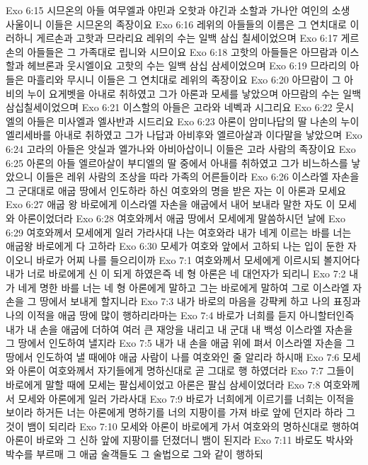 Exo 6:15  시므온의 아들 여무엘과 야민과 오핫과 야긴과 소할과 가나안 여인의 소생 사울이니 이들은 시므온의 족장이요
Exo 6:16  레위의 아들들의 이름은 그 연치대로 이러하니 게르손과 고핫과 므라리요 레위의 수는 일백 삼십 칠세이었으며
Exo 6:17  게르손의 아들들은 그 가족대로 립니와 시므이요
Exo 6:18  고핫의 아들들은 아므람과 이스할과 헤브론과 웃시엘이요 고핫의 수는 일백 삼십 삼세이었으며
Exo 6:19  므라리의 아들은 마흘리와 무시니 이들은 그 연치대로 레위의 족장이요
Exo 6:20  아므람이 그 아비의 누이 요게벳을 아내로 취하였고 그가 아론과 모세를 낳았으며 아므람의 수는 일백삼십칠세이었으며
Exo 6:21  이스할의 아들은 고라와 네벡과 시그리요
Exo 6:22  웃시엘의 아들은 미사엘과 엘사반과 시드리요
Exo 6:23  아론이 암미나답의 딸 나손의 누이 엘리세바를 아내로 취하였고 그가 나답과 아비후와 엘르아살과 이다말을 낳았으며
Exo 6:24  고라의 아들은 앗실과 엘가나와 아비아삽이니 이들은 고라 사람의 족장이요
Exo 6:25  아론의 아들 엘르아살이 부디엘의 딸 중에서 아내를 취하였고 그가 비느하스를 낳았으니 이들은 레위 사람의 조상을 따라 가족의 어른들이라
Exo 6:26  이스라엘 자손을 그 군대대로 애굽 땅에서 인도하라 하신 여호와의 명을 받은 자는 이 아론과 모세요
Exo 6:27  애굽 왕 바로에게 이스라엘 자손을 애굽에서 내어 보내라 말한 자도 이 모세와 아론이었더라
Exo 6:28  여호와께서 애굽 땅에서 모세에게 말씀하시던 날에
Exo 6:29  여호와께서 모세에게 일러 가라사대 나는 여호와라 내가 네게 이르는 바를 너는 애굽왕 바로에게 다 고하라
Exo 6:30  모세가 여호와 앞에서 고하되 나는 입이 둔한 자이오니 바로가 어찌 나를 들으리이까
Exo 7:1  여호와께서 모세에게 이르시되 볼지어다 내가 너로 바로에게 신 이 되게 하였은즉 네 형 아론은 네 대언자가 되리니
Exo 7:2  내가 네게 명한 바를 너는 네 형 아론에게 말하고 그는 바로에게 말하여 그로 이스라엘 자손을 그 땅에서 보내게 할지니라
Exo 7:3  내가 바로의 마음을 강퍅케 하고 나의 표징과 나의 이적을 애굽 땅에 많이 행하리라마는
Exo 7:4  바로가 너희를 듣지 아니할터인즉 내가 내 손을 애굽에 더하여 여러 큰 재앙을 내리고 내 군대 내 백성 이스라엘 자손을 그 땅에서 인도하여 낼지라
Exo 7:5  내가 내 손을 애굽 위에 펴서 이스라엘 자손을 그 땅에서 인도하여 낼 때에야 애굽 사람이 나를 여호와인 줄 알리라 하시매
Exo 7:6  모세와 아론이 여호와께서 자기들에게 명하신대로 곧 그대로 행 하였더라
Exo 7:7  그들이 바로에게 말할 때에 모세는 팔십세이었고 아론은 팔십 삼세이었더라
Exo 7:8  여호와께서 모세와 아론에게 일러 가라사대
Exo 7:9  바로가 너희에게 이르기를 너희는 이적을 보이라 하거든 너는 아론에게 명하기를 너의 지팡이를 가져 바로 앞에 던지라 하라 그것이 뱀이 되리라
Exo 7:10  모세와 아론이 바로에게 가서 여호와의 명하신대로 행하여 아론이 바로와 그 신하 앞에 지팡이를 던졌더니 뱀이 된지라
Exo 7:11  바로도 박사와 박수를 부르매 그 애굽 술객들도 그 술법으로 그와 같이 행하되
